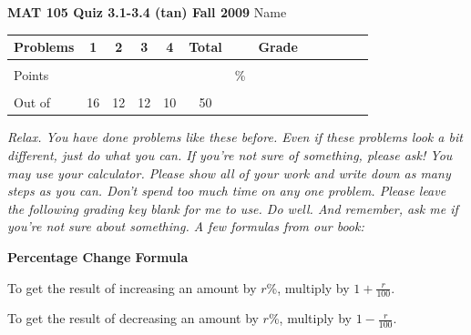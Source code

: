 \documentclass[12pt]{article}
\begin{document}
{\bf MAT 105 Quiz 3.1-3.4 (tan) Fall 2009} \hspace{.4in} {\large Name} \hrulefill

\hrulefill


\begin{center}

\begin{tabular}
{|l|c|c|c|c|c|c|c|c|c|c|c|c|} \hline

 Problems & \hspace{5 pt} 1 \hspace{5 pt}  & \hspace{5 pt} 2 \hspace{5 pt} & \hspace{5 pt} 3 \hspace{5 pt} & \hspace{5 pt} 4 \hspace{5 pt} &  \hspace{5 pt} Total  \hspace{5 pt} & &  \hspace{5 pt} Grade \hspace{5 pt}  \\ \hline
&&&&& &&\\  
Points &&&&& &    \hspace{.8in}\% &  \\ 
&&&&& && \\  \hline
Out of & 16 & 12  & 12 & 10 &50 & & \\ \hline

\end {tabular}
 
\end{center}

 \emph{Relax.  You have done problems like these before.  Even if these problems look a bit different, just do what you can.  If you're not sure of something, please ask! You may use your calculator.  Please show all of your work and write down as many steps as you can.  Don't spend too much time on any one problem.  Please leave the following grading key blank for me to use.  Do well.  And remember, ask me if you're not sure about something. A few formulas from our book:}
  \vspace{.2in}
 
  \begin{center}
\textbf{Percentage Change Formula}
\vspace{.1in}

To get the result of increasing an amount by $r$\%, multiply by $1+\frac{r}{100}.$
\vspace{.1in}

To get the result of decreasing an amount by $r$\%, multiply by $1-\frac{r}{100}.$
 \end{center}
 
\end{document}
